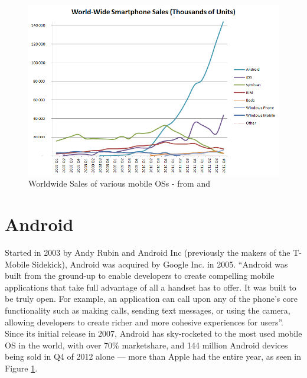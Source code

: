 \begin{figure}[h]
\begin{center}
\includegraphics[width=0.8\columnwidth]{figs/World_Wide_Smartphone_Sales}
\caption{Worldwide Sales of various mobile OSs - from \citep{wikimobilesales} and \citep{gartnerq42012}}
\label{fig:mobilesales}
\end{center}
\end{figure}


\section{Android}
Started in 2003 by Andy Rubin and Android Inc (previously the makers of the T-Mobile Sidekick), Android was acquired by Google Inc. in 2005\citep{businessweek2005}. ``Android was built from the ground-up to enable developers to create compelling mobile applications that take full advantage of all a handset has to offer. It was built to be truly open. For example, an application can call upon any of the phone's core functionality such as making calls, sending text messages, or using the camera, allowing developers to create richer and more cohesive experiences for users''\citep{ohaandroidoverview}. Since its initial release in 2007\citep{oharelease2007}, Android has sky-rocketed to the most used mobile OS in the world, with over 70\% marketshare, and 144 million Android devices being sold in Q4 of 2012 alone\citep{gartnerq42012} --- more than Apple had the entire year, as seen in Figure \ref{fig:mobilesales}.



